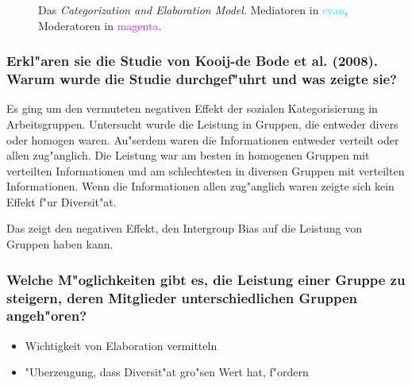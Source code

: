 \begin{figure}[<+htpb+>]
\begin{center}
        \end{center}
        \caption{Das \emph{Categorization and Elaboration Model}. Mediatoren in \textcolor{cyan}{cyan}, Moderatoren in \textcolor{magenta}{magenta}.}
        \label{fig:catelab}
\end{figure}

\subsubsection{Erkl"aren sie die Studie von Kooij-de Bode et al. (2008). Warum wurde die Studie durchgef"uhrt und was zeigte sie?}
Es ging um den vermuteten negativen Effekt der sozialen Kategorisierung in Arbeitsgruppen. Untersucht wurde die Leistung in Gruppen, die entweder divers oder homogen waren. Au"serdem waren die Informationen entweder verteilt oder allen zug"anglich. Die Leistung war am besten in homogenen Gruppen mit verteilten Informationen und am schlechtesten in diversen Gruppen mit verteilten Informationen. Wenn die Informationen allen zug"anglich waren zeigte sich kein Effekt f"ur Diversit"at.

Das zeigt den negativen Effekt, den Intergroup Bias auf die Leistung von Gruppen haben kann.

\subsubsection{Welche M"oglichkeiten gibt es, die Leistung einer Gruppe zu steigern, deren Mitglieder unterschiedlichen Gruppen angeh"oren?}
\begin{itemize}
        \item Wichtigkeit von Elaboration vermitteln
        \item "Uberzeugung, dass Diversit"at gro"sen Wert hat, f"ordern
\end{itemize}
